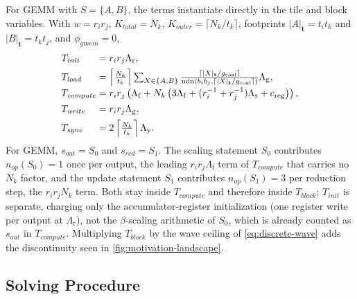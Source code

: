 \documentclass[acmsmall,review,anonymous,screen]{acmart}
\newcommand{\tile}{t}
\newcommand{\tvec}{\mathbf{t}}
\newcommand{\rblk}{r}
\newcommand{\work}{w}
\newcommand{\gcoal}{g_{\mathrm{coal}}}
\newcommand{\Lg}{\Lambda_{\mathrm g}}
\newcommand{\Ls}{\Lambda_{\mathrm s}}
\newcommand{\Lr}{\Lambda_{\mathrm r}}
\newcommand{\Lf}{\Lambda_{\mathrm f}}
\newcommand{\Ly}{\Lambda_{\mathrm y}}
\newcommand{\creg}{c_{\mathrm{reg}}}
\begin{document}
For GEMM with \(S=\{A,B\}\), the terms instantiate directly in the tile and block variables. With \(\work=\rblk_i\rblk_j\), \(K_{\mathit{total}}=N_k\), \(K_{\mathit{outer}}=\lceil N_k/\tile_k\rceil\), footprints \(|A|_{\tvec}=\tile_i\tile_k\) and \(|B|_{\tvec}=\tile_k\tile_j\), and \(\phi_{\mathit{gmem}}=0\),
\begingroup
\renewcommand{\arraystretch}{1.18}
\[
\begin{array}{@{}l@{\;}l@{}}
T_{\mathit{init}}
&= \rblk_i\rblk_j\Lr,\\[1ex]
T_{\mathit{load}}
&= \left\lceil\frac{N_k}{\tile_k}\right\rceil
   \sum_{X\in\{A,B\}}
   \frac{\lceil |X|_{\tvec}/\gcoal\rceil}{\min(b_i b_j,\lceil |X|_{\tvec}/\gcoal\rceil)}
   \Lg,\\[1ex]
T_{\mathit{compute}}
&= \rblk_i\rblk_j
   \left(
   \Lf
   + N_k\left(3\Lf+(\rblk_i^{-1}+\rblk_j^{-1})\Ls+\creg\right)
   \right),\\[1ex]
T_{\mathit{write}}
&= \rblk_i\rblk_j\Lg,\\[1ex]
T_{\mathit{sync}}
&= 2\left\lceil\frac{N_k}{\tile_k}\right\rceil\Ly.
\end{array}
\]
\endgroup
For GEMM, \(s_{\mathit{out}}=S_0\) and \(s_{\mathit{red}}=S_1\). The scaling statement \(S_0\) contributes \(n_{\mathit{op}}(S_0)=1\) once per output, the leading \(\rblk_i\rblk_j\Lf\) term of \(T_{\mathit{compute}}\) that carries no \(N_k\) factor, and the update statement \(S_1\) contributes \(n_{\mathit{op}}(S_1)=3\) per reduction step, the \(\rblk_i\rblk_jN_k\) term. Both stay inside \(T_{\mathit{compute}}\) and therefore inside \(T_{\mathit{block}}\); \(T_{\mathit{init}}\) is separate, charging only the accumulator-register initialization (one register write per output at \(\Lr\)), not the \(\beta\)-scaling arithmetic of \(S_0\), which is already counted as \(s_{\mathit{out}}\) in \(T_{\mathit{compute}}\). Multiplying \(T_{\mathit{block}}\) by the wave ceiling of \autoref{eq:discrete-wave} adds the discontinuity seen in \autoref{fig:motivation-landscape}.

\subsection{Solving Procedure}
\label{sec:solver}
\label{sec:two-stage-solver}
\end{document}
